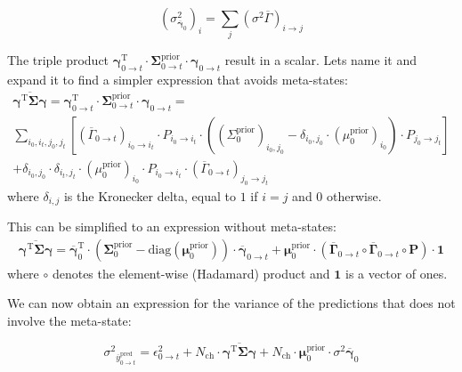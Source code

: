 \documentclass[pdflatex,sn-mathphys-num]{sn-jnl}%
\theoremstyle{thmstyleone}%
\theoremstyle{thmstyletwo}%
\theoremstyle{thmstylethree}%
\begin{document}
\begin{equation}
	(\sigma^2_{\overline{\mathbf{\gamma}}_{0}})_i = \sum_j (\sigma^2 \overline{\Gamma})_{i \rightarrow j}
	\label{eq:sigma_gamma_i}
\end{equation}


The triple product $\mathbf{\gamma}^{\mathrm{T}}_{0 \rightarrow t} \cdot \mathbf{\Sigma}^{\mathrm{prior}}_{0 \rightarrow t} \cdot \mathbf{\gamma}_{0 \rightarrow t}$ result in a scalar. Lets name it and expand it to find a simpler expression that avoids meta-states:
\begin{multline}
	\overline{\mathbf{\gamma}^{\mathrm{T}} \mathbf{\Sigma}\mathbf{\gamma}}=
	\mathbf{\gamma}^{\mathrm{T}}_{0 \rightarrow t} \cdot \mathbf{\Sigma}^{\mathrm{prior}}_{0 \rightarrow t} \cdot \mathbf{\gamma}_{0 \rightarrow t} = \\
	\sum_{i_0, i_t, j_0, j_t} 
	\left[ (\overline{\Gamma}_{0 \rightarrow t})_{i_0 \rightarrow i_t} \cdot P_{i_0 \rightarrow i_t} \cdot \left( (\Sigma^{\mathrm{prior}}_{0})_{i_0, j_0} - \delta_{i_0, j_0} \cdot (\mu^{\mathrm{prior}}_0)_{i_0} \right) \cdot P_{j_0 \rightarrow j_t} \right] \\
	+ \delta_{i_0, j_0} \cdot \delta_{i_t, j_t} \cdot (\mu^{\mathrm{prior}}_0)_{i_0} \cdot P_{i_0 \rightarrow i_t} \cdot (\overline{\Gamma}_{0 \rightarrow t})_{j_0 \rightarrow j_t}
	\label{eq:meta_state_cov_mult}
\end{multline}
where $\delta_{i, j}$ is the Kronecker delta, equal to $1$ if $i = j$ and $0$ otherwise.

This can be simplified to an expression without meta-states:
\begin{multline}
		\overline{\mathbf{\gamma}^{\mathrm{T}} \mathbf{\Sigma}\mathbf{\gamma}}= 
	\overline{\mathbf{\gamma}}_{0}^{\mathrm{T}} \cdot 
	\left( \mathbf{\Sigma}^{\mathrm{prior}}_{0} - \mathrm{diag}(\mathbf{\mu}^{\mathrm{prior}}_0) \right) \cdot 
	\overline{\mathbf{\gamma}}_{0 \rightarrow t} 
	+ \mathbf{\mu}^{\mathrm{prior}}_0 \cdot \left( \overline{\mathbf{\Gamma}}_{0 \rightarrow t} \circ \overline{\mathbf{\Gamma}}_{0 \rightarrow t} \circ \mathbf{P} \right) \cdot \mathbf{1}
	\label{eq:simplified_meta_state}
\end{multline}
where \( \circ \) denotes the element-wise (Hadamard) product and \( \mathbf{1} \) is a vector of ones.

We can now obtain an expression for the variance of the predictions that does not involve the meta-state: 

\begin{equation}
	{\sigma^2}_{\overline{y}^{\mathrm{pred}}_{0 \rightarrow t}}
	= \epsilon^2_{0 \rightarrow t} + N_{\mathrm{ch}} \cdot\overline{\mathbf{\gamma}^{\mathrm{T}} \mathbf{\Sigma}\mathbf{\gamma}}
	+ N_{\mathrm{ch}} \cdot \mathbf{\mu}^{\mathrm{prior}}_{0} \cdot {\sigma^2 \overline{\mathbf{\gamma}}}_{0}
	\label{eq:macro_interval_sigma_pred}
\end{equation}
\end{document}
